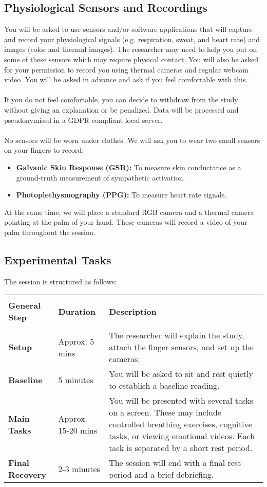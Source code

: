 \documentclass[12pt]{article}
\begin{document}
\newpage
\subsection{Physiological Sensors and Recordings}
You will be asked to use sensors and/or software applications that will capture and record your physiological signals (e.g. respiration, sweat, and heart rate) and images (color and thermal images). The researcher may need to help you put on some of these sensors which may require physical contact. You will also be asked for your permission to record you using thermal cameras and regular webcam video. You will be asked in advance and ask if you feel comfortable with this. 
\\
\\
If you do not feel comfortable, you can decide to withdraw from the study without giving an explanation or be penalized. Data will be processed and pseudonymised in a GDPR compliant local server.
\\
\\
No sensors will be worn under clothes. We will ask you to wear two small sensors on your fingers to record:
\begin{itemize}
    \item \textbf{Galvanic Skin Response (GSR):} To measure skin conductance as a ground-truth measurement of sympathetic activation.
    \item \textbf{Photoplethysmography (PPG):} To measure heart rate signals.
\end{itemize}
At the same time, we will place a standard RGB camera and a thermal camera pointing at the palm of your hand. These cameras will record a video of your palm throughout the session.

\subsection{Experimental Tasks}
The session is structured as follows:

\bigskip

\noindent
\begin{tabularx}{\textwidth}{@{} >{\bfseries}l l X @{}}
    \hline \\[-1.5ex]
    \textbf{General Step} & \textbf{Duration} & \textbf{Description} \\ 
    \hline \\[-1.5ex]
    Setup & Approx. 5 mins & The researcher will explain the study, attach the finger sensors, and set up the cameras. \\
    Baseline & 5 minutes & You will be asked to sit and rest quietly to establish a baseline reading. \\
    Main Tasks & Approx. 15-20 mins & You will be presented with several tasks on a screen. These may include controlled breathing exercises, cognitive tasks, or viewing emotional videos. Each task is separated by a short rest period. \\
    Final Recovery & 2-3 minutes & The session will end with a final rest period and a brief debriefing. \\
    \hline
\end{tabularx}
\end{document}
